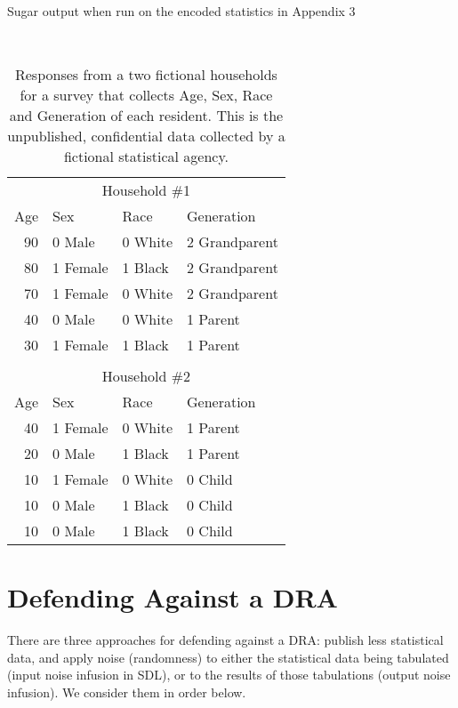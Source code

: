\documentclass[runningheads]{llncs}
\begin{document}
\begin{table*}
\begin{minipage}[t]{.45\linewidth}
~\\
\caption{Sugar output when run on the encoded statistics in Appendix 3}\label{sugarbig}

\end{minipage}
\hfill
\begin{minipage}[t]{.45\linewidth}
~\\
\caption{Responses from a two fictional households
for a survey that collects Age, Sex, Race and Generation of each resident. This is
the unpublished, confidential data collected by a fictional statistical
agency.}\label{responses}
\begin{tabular}{rllp{1in}}
\hline
\multicolumn{4}{c}{Household \#1}   \\
Age & Sex & Race & Generation     \\
\hline
90  & 0 Male   & 0 White & 2 Grandparent   \\      
80  & 1 Female & 1 Black & 2 Grandparent \\    
70  & 1 Female & 0 White & 2 Grandparent \\  
40  & 0 Male   & 0 White & 1 Parent        \\
30  & 1 Female & 1 Black & 1 Parent      \\
\hline
\\
\multicolumn{4}{c}{Household \#2} \\
Age & Sex & Race & Generation     \\
\hline
40 & 1 Female & 0 White & 1 Parent      \\
20 & 0 Male   & 1 Black & 1 Parent        \\
10 & 1 Female & 0 White & 0 Child       \\
10 & 0 Male   & 1 Black & 0 Child         \\
10 & 0 Male   & 1 Black & 0 Child         \\
\hline
\end{tabular}
\end{minipage}
\end{table*}



\section{Defending Against a DRA}\label{solution}
There are three approaches for defending against a DRA: publish less
statistical data, and apply noise (randomness) to either the
statistical data being tabulated (input noise infusion in SDL), or to the results of those
tabulations (output noise infusion). We consider them in order below.
\end{document}
